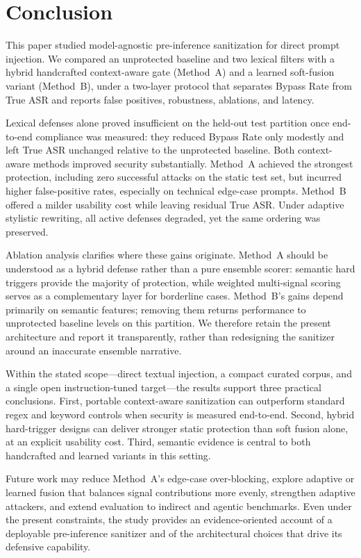 
\section{Conclusion}
\label{sec:conclusion}

This paper studied model-agnostic pre-inference sanitization for direct prompt injection.
We compared an unprotected baseline and two lexical filters with a hybrid handcrafted context-aware gate (Method~A) and a learned soft-fusion variant (Method~B), under a two-layer protocol that separates Bypass Rate from True ASR and reports false positives, robustness, ablations, and latency.

Lexical defenses alone proved insufficient on the held-out test partition once end-to-end compliance was measured: they reduced Bypass Rate only modestly and left True ASR unchanged relative to the unprotected baseline.
Both context-aware methods improved security substantially.
Method~A achieved the strongest protection, including zero successful attacks on the static test set, but incurred higher false-positive rates, especially on technical edge-case prompts.
Method~B offered a milder usability cost while leaving residual True ASR.
Under adaptive stylistic rewriting, all active defenses degraded, yet the same ordering was preserved.

Ablation analysis clarifies where these gains originate.
Method~A should be understood as a hybrid defense rather than a pure ensemble scorer: semantic hard triggers provide the majority of protection, while weighted multi-signal scoring serves as a complementary layer for borderline cases.
Method~B's gains depend primarily on semantic features; removing them returns performance to unprotected baseline levels on this partition.
We therefore retain the present architecture and report it transparently, rather than redesigning the sanitizer around an inaccurate ensemble narrative.

Within the stated scope---direct textual injection, a compact curated corpus, and a single open instruction-tuned target---the results support three practical conclusions.
First, portable context-aware sanitization can outperform standard regex and keyword controls when security is measured end-to-end.
Second, hybrid hard-trigger designs can deliver stronger static protection than soft fusion alone, at an explicit usability cost.
Third, semantic evidence is central to both handcrafted and learned variants in this setting.

Future work may reduce Method~A's edge-case over-blocking, explore adaptive or learned fusion that balances signal contributions more evenly, strengthen adaptive attackers, and extend evaluation to indirect and agentic benchmarks.
Even under the present constraints, the study provides an evidence-oriented account of a deployable pre-inference sanitizer and of the architectural choices that drive its defensive capability.
